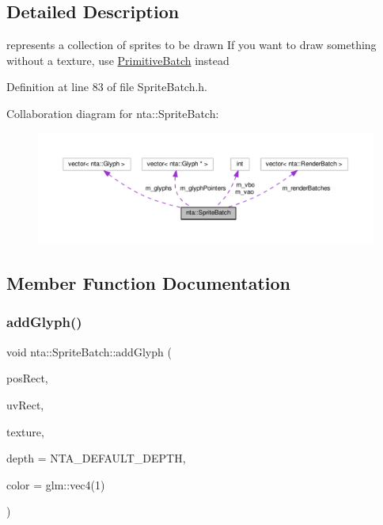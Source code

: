 \subsection{Detailed Description}
represents a collection of sprites to be drawn If you want to draw something without a texture, use \hyperlink{classnta_1_1PrimitiveBatch}{Primitive\+Batch} instead 

Definition at line 83 of file Sprite\+Batch.\+h.



Collaboration diagram for nta\+:\+:Sprite\+Batch\+:\nopagebreak
\begin{figure}[H]
\begin{center}
\leavevmode
\includegraphics[width=350pt]{da/dc5/classnta_1_1SpriteBatch__coll__graph}
\end{center}
\end{figure}


\subsection{Member Function Documentation}
\mbox{\label{classnta_1_1SpriteBatch_aa703fb92d0bd42865c21fdfb2625660d}} 
\subsubsection{\texorpdfstring{add\+Glyph()}{addGlyph()}}
{\footnotesize\ttfamily void nta\+::\+Sprite\+Batch\+::add\+Glyph (\begin{DoxyParamCaption}\item[{crvec4}]{pos\+Rect,  }\item[{crvec4}]{uv\+Rect,  }\item[{G\+Luint}]{texture,  }\item[{float}]{depth = {\ttfamily NTA\+\_\+DEFAULT\+\_\+DEPTH},  }\item[{crvec4}]{color = {\ttfamily glm\+:\+:vec4(1)} }\end{DoxyParamCaption})}

